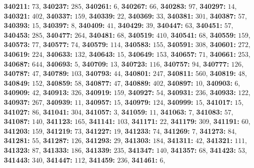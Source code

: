 \textsf{\bfseries 340211:} $73$, \textsf{\bfseries 340237:} $285$, \textsf{\bfseries 340261:} $6$, \textsf{\bfseries 340267:} $66$, \textsf{\bfseries 340283:} $97$, \textsf{\bfseries 340297:} $14$, \textsf{\bfseries 340321:} $402$, \textsf{\bfseries 340337:} $159$, \textsf{\bfseries 340339:} $22$, \textsf{\bfseries 340369:} $33$, \textsf{\bfseries 340381:} $301$, \textsf{\bfseries 340387:} $57$, \textsf{\bfseries 340393:} $15$, \textsf{\bfseries 340397:} $8$, \textsf{\bfseries 340409:} $41$, \textsf{\bfseries 340429:} $39$, \textsf{\bfseries 340447:} $63$, \textsf{\bfseries 340451:} $57$, \textsf{\bfseries 340453:} $285$, \textsf{\bfseries 340477:} $264$, \textsf{\bfseries 340481:} $68$, \textsf{\bfseries 340519:} $410$, \textsf{\bfseries 340541:} $68$, \textsf{\bfseries 340559:} $159$, \textsf{\bfseries 340573:} $77$, \textsf{\bfseries 340577:} $74$, \textsf{\bfseries 340579:} $114$, \textsf{\bfseries 340583:} $155$, \textsf{\bfseries 340591:} $308$, \textsf{\bfseries 340601:} $272$, \textsf{\bfseries 340619:} $224$, \textsf{\bfseries 340633:} $132$, \textsf{\bfseries 340643:} $15$, \textsf{\bfseries 340649:} $153$, \textsf{\bfseries 340657:} $71$, \textsf{\bfseries 340661:} $253$, \textsf{\bfseries 340687:} $644$, \textsf{\bfseries 340693:} $5$, \textsf{\bfseries 340709:} $13$, \textsf{\bfseries 340723:} $116$, \textsf{\bfseries 340757:} $94$, \textsf{\bfseries 340777:} $126$, \textsf{\bfseries 340787:} $47$, \textsf{\bfseries 340789:} $103$, \textsf{\bfseries 340793:} $44$, \textsf{\bfseries 340801:} $247$, \textsf{\bfseries 340811:} $560$, \textsf{\bfseries 340819:} $48$, \textsf{\bfseries 340849:} $152$, \textsf{\bfseries 340859:} $58$, \textsf{\bfseries 340877:} $47$, \textsf{\bfseries 340889:} $402$, \textsf{\bfseries 340897:} $10$, \textsf{\bfseries 340903:} $6$, \textsf{\bfseries 340909:} $42$, \textsf{\bfseries 340913:} $326$, \textsf{\bfseries 340919:} $159$, \textsf{\bfseries 340927:} $54$, \textsf{\bfseries 340931:} $236$, \textsf{\bfseries 340933:} $122$, \textsf{\bfseries 340937:} $267$, \textsf{\bfseries 340939:} $11$, \textsf{\bfseries 340957:} $15$, \textsf{\bfseries 340979:} $124$, \textsf{\bfseries 340999:} $15$, \textsf{\bfseries 341017:} $15$, \textsf{\bfseries 341027:} $86$, \textsf{\bfseries 341041:} $304$, \textsf{\bfseries 341057:} $3$, \textsf{\bfseries 341059:} $11$, \textsf{\bfseries 341063:} $7$, \textsf{\bfseries 341083:} $57$, \textsf{\bfseries 341087:} $140$, \textsf{\bfseries 341123:} $165$, \textsf{\bfseries 341141:} $103$, \textsf{\bfseries 341171:} $22$, \textsf{\bfseries 341179:} $309$, \textsf{\bfseries 341191:} $60$, \textsf{\bfseries 341203:} $159$, \textsf{\bfseries 341219:} $73$, \textsf{\bfseries 341227:} $19$, \textsf{\bfseries 341233:} $74$, \textsf{\bfseries 341269:} $7$, \textsf{\bfseries 341273:} $84$, \textsf{\bfseries 341281:} $55$, \textsf{\bfseries 341287:} $126$, \textsf{\bfseries 341293:} $29$, \textsf{\bfseries 341303:} $184$, \textsf{\bfseries 341311:} $42$, \textsf{\bfseries 341321:} $111$, \textsf{\bfseries 341323:} $87$, \textsf{\bfseries 341333:} $186$, \textsf{\bfseries 341339:} $235$, \textsf{\bfseries 341347:} $140$, \textsf{\bfseries 341357:} $68$, \textsf{\bfseries 341423:} $53$, \textsf{\bfseries 341443:} $340$, \textsf{\bfseries 341447:} $112$, \textsf{\bfseries 341459:} $236$, \textsf{\bfseries 341461:} $6$, 
